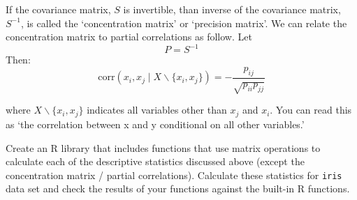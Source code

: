 If the covariance matrix, $S$ is invertible, than inverse of the
covariance matrix, $S^{-1}$, is called the `concentration matrix' or
`precision matrix'. We can relate the concentration matrix to partial
correlations as follow. Let 
\[
P = S^{-1}
\]
Then:
\[
\mbox{corr}(x_i,x_j \mid X \backslash \{x_i,x_j\}) = -\frac{p_{ij}}{\sqrt{p_{ii} p_{jj}}}
\]

where $X \backslash \{x_i,x_j\}$ indicates all variables other than
$x_j$ and $x_i$. You can read this as `the correlation between x and y
conditional on all other variables.'

\medskip

\begin{assignment}
Create an R library that includes functions that
use matrix operations to calculate each of the descriptive statistics
discussed above (except the concentration matrix / partial
correlations). Calculate these statistics for \lstinline!iris! data set and check the results of your
functions against the built-in R functions.
\end{assignment}

